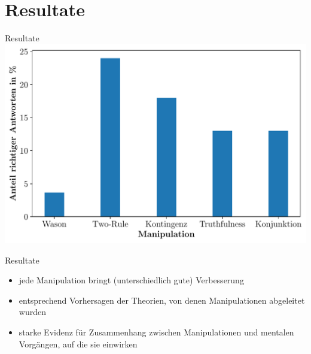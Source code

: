 
\section{Resultate}

\begin{frame}{Resultate {\scriptsize \cite[S.~101]{stenningHumanReasoningCognitive2008}}}
    \includegraphics[width=\textwidth]{../plot/results_correct.pdf}
\end{frame}


\begin{frame}{Resultate {\scriptsize \cite[S.~101-102]{stenningHumanReasoningCognitive2008}}}
    \begin{itemize}
        \item jede Manipulation bringt (unterschiedlich gute) Verbesserung
        \item entsprechend Vorhersagen der Theorien, von denen Manipulationen abgeleitet wurden
        \item starke Evidenz für Zusammenhang zwischen Manipulationen und mentalen Vorgängen, auf die sie einwirken
    \end{itemize}
\end{frame}


